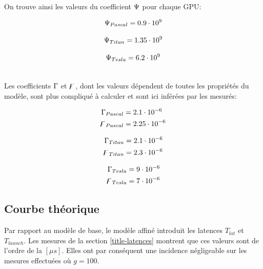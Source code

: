 \noindent On trouve ainsi les valeurs du coefficient $\Psi$ pour chaque \acs{GPU}:\\

\noindent\begin{minipage}{.33\linewidth}
	\begin{equation*}
	\Psi_{Pascal} = 0.9 \cdot 10^9
	\end{equation*}
\end{minipage}%
\begin{minipage}{.33\linewidth}
	\begin{equation*}
	\Psi_{Titan} = 1.35 \cdot 10^9
	\end{equation*}
\end{minipage}
\begin{minipage}{.33\linewidth}
	\begin{equation*}
	\Psi_{Tesla}  = 6.2 \cdot 10^9
	\end{equation*}
\end{minipage}\\[\baselineskip]

\noindent Les coefficients $\Gamma $ et $\digamma $, dont les valeurs dépendent de toutes les propriétés du modèle, sont plus compliqué à calculer et sont ici inférées par les mesurés: 

\noindent\begin{minipage}{.33\linewidth}
\begin{align*}
\Gamma_{Pascal} &= 2.1\cdot 10^{-6}\\
\digamma_{Pascal} &= 2.25\cdot 10^{-6}\\
\end{align*}
\end{minipage}%
\begin{minipage}{.33\linewidth}
\begin{align*}
\Gamma_{Titan} &= 2.1\cdot 10^{-6}\\
\digamma_{Titan} &= 2.3\cdot 10^{-6}\\
\end{align*}
\end{minipage}%
\begin{minipage}{.33\linewidth}
\begin{align*}
\Gamma_{Tesla} &= 9\cdot 10^{-6}\\
\digamma_{Tesla} &= 7\cdot 10^{-6}\\
\end{align*}
\end{minipage}

\subsection{Courbe théorique}
Par rapport au modèle de base, le modèle affiné introduit les latences $T_{lat}$ et $T_{launch}$. Les mesures de la section \ref{title-latences} montrent que ces valeurs sont de l'ordre de la $[\mu s]$. Elles ont par conséquent une incidence négligeable sur les mesures effectuées où $g=100$.

